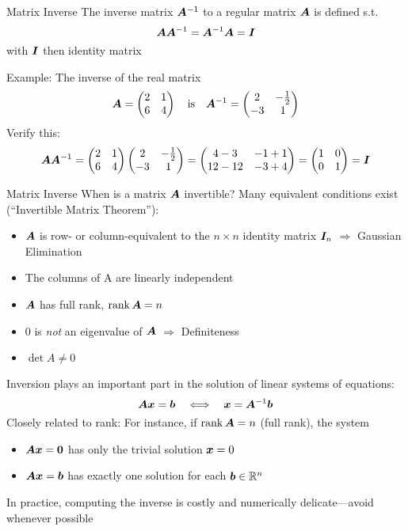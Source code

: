 \begin{frame}{Matrix Inverse}
    The inverse matrix $\bm{A}^{-1}$ to a regular matrix $\bm{A}$ is defined s.t.
    $$\bm{A} \bm{A}^{-1} = \bm{A}^{-1} \bm{A} = \bm{I}$$
    with $\bm{I}$ then identity matrix

    Example: The inverse of the real matrix
    $$\displaystyle \bm{A} = \begin{pmatrix} 2 & 1 \\ 6 & 4 \end{pmatrix} \quad \text{is} \quad \bm{A}^{-1} = \begin{pmatrix} 2 & -\tfrac{1}{2} \\ -3 & 1 \end{pmatrix}$$
    Verify this:
    $$
        \bm{A} \bm{A}^{-1} = \begin{pmatrix} 2 & 1 \\ 6 & 4 \end{pmatrix} \begin{pmatrix} 2 & -\tfrac{1}{2} \\ -3 & 1 \end{pmatrix}
        = \begin{pmatrix} 4-3 & -1+1 \\ 12-12 & -3+4 \end{pmatrix} = \begin{pmatrix} 1 & 0 \\ 0 & 1 \end{pmatrix} = \bm{I}
    $$
\end{frame}

\begin{frame}{Matrix Inverse}
    When is a matrix $\bm{A}$ invertible? Many equivalent conditions exist (``Invertible Matrix Theorem''):
    \begin{itemize}
        \item $\bm{A}$ is row- or column-equivalent to the $n \times n$ identity matrix $\bm{I}_n$ $\Rightarrow$ Gaussian Elimination
        \item The columns of A are linearly independent
        \item $\bm{A}$ has full rank, $\rank \bm{A} = n$
        \item $0$ is \emph{not} an eigenvalue of $\bm{A}$ $\Rightarrow$ Definiteness
        \item $\det A \neq 0$
    \end{itemize}

    Inversion plays an important part in the solution of linear systems of equations:
    $$\bm{A} \bm{x} = \bm{b} \quad \Longleftrightarrow \quad \bm{x} = \bm{A}^{-1} \bm{b}$$
    Closely related to rank: For instance, if $\rank \bm{A} = n$ (full rank), the system
    \begin{itemize}
        \item $\bm{A} \bm{x} = \bm{0}$ has only the trivial solution $\bm{x} = 0$
        \item $\bm{A} \bm{x} = \bm{b}$ has exactly one solution for each $\bm{b} \in \mathbb{R}^n$
    \end{itemize}
    In practice, computing the inverse is costly and numerically delicate---avoid whenever possible
\end{frame}


